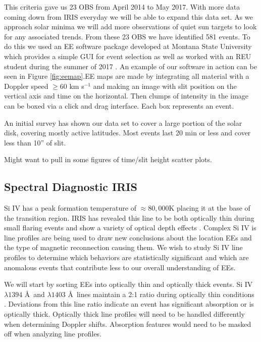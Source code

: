 \documentclass[]{aastex6}
\begin{document}
	This criteria gave us 23 OBS from April 2014 to May 2017.  With more data coming down from IRIS everyday we will be able to expand this data set.  As we approach solar minima we will add more observations of quiet sun targets to look for any associated trends.  From these 23 OBS we have identified 581 events.  To do this we used an EE software package developed at Montana State University which provides a simple GUI for event selection as well as worked with an REU student during the summer of 2017 \citep{Bartz2018}.  An example of our software in action can be seen in Figure \ref{fig:eemap}.EE maps are made by integrating all material with a Doppler speed $\geq60$ km s$^{-1}$ and making an image with slit position on the vertical axis and time on the horizontal.  Then clumps of intensity in the image can be boxed via a click and drag interface.  Each box represents an event.
	
	An initial survey has shown our data set to cover a large portion of the solar disk, covering mostly active latitudes.  Most events last 20 min or less and cover less than 10'' of slit.
	
	Might want to pull in some figures of time/slit height scatter plots.

	
	\subsection{Spectral Diagnostic IRIS}
	Si IV has a peak formation temperature of $\approx 80,000$K placing it at the base of the transition region.  IRIS has revealed this line to be both optically thin during small flaring events and show a variety of optical depth effects \citep{Peter2014,Yan2015}.  Complex Si IV is line profiles are being used to draw new conclusions about the location EEs and the type of magnetic reconnection causing them.  We wish to study Si IV line profiles to determine which behaviors are statistically significant and which are anomalous events that contribute less to our overall understanding of EEs.
	
	We will start by sorting EEs into optically thin and optically thick events.  Si IV $\lambda 1394$ \AA \ and $\lambda 1403$ \AA \ lines maintain a 2:1 ratio during optically thin conditions  \citep{Mathioudakis1999}.  Deviations from this line ratio indicate an event has significant absorption or is optically thick.  Optically thick line profiles will need to be handled differently when determining Doppler shifts.  Absorption features would need to be masked off when analyzing line profiles.  
	
\end{document}
